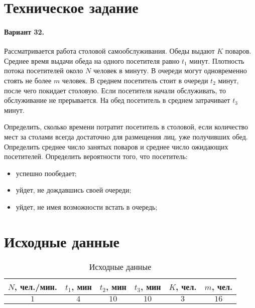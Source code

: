 





\tableofcontents
\listoftables
\listoffigures
\newpage

\section{Техническое задание}

\paragraph{Вариант 32.} 
Рассматривается работа столовой самообслуживания. Обеды выдают $K$ поваров. Среднее время выдачи обеда на одного посетителя равно $t_1$ минут. Плотность потока посетителей около $N$ человек в минуту. В очереди могут одновременно стоять не более $m$ человек. В среднем посетитель стоит в очереди $t_2$ минут, после чего покидает столовую. Если посетителя начали обслуживать, то обслуживание не прерывается. На обед посетитель в среднем затрачивает $t_3$ минут. 

Определить, сколько времени потратит посетитель в столовой, если количество мест за столами всегда достаточно для размещения лиц, уже получивших обед. Определить среднее число занятых поваров и среднее число ожидающих посетителей. Определить вероятности того, что посетитель:
\begin{itemize}
	\item успешно пообедает;
	\item уйдет, не дождавшись своей очереди;
	\item уйдет, не имея возможности встать в очередь;
\end{itemize} 

\section{Исходные данные}

\begin{table}[H]
	\begin{center}
		\caption{Исходные данные}
		\def\tabcolsep{12pt}
		\begin{tabular}{|c|c|c|c|c|c|}
			\hline
			$N$, чел./мин. & $t_1$, мин & $t_2$, мин & $t_3$, мин & $K$, чел. & $m$, чел. \\
			\hline
			$1$ & $4$ & $10$ & $10$ & $3$ & $16$ \\
			\hline	
		\end{tabular}
	\end{center}
\end{table}

